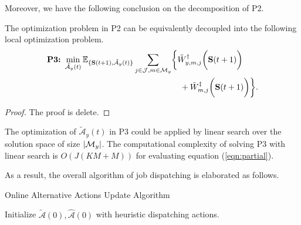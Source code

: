 Moreover, we have the following conclusion on the decomposition of P2.
\begin{lemma}[]
    The optimization problem in P2 can be equivalently decoupled into the following local optimization problem.
    {\small
    \begin{align}
        \textbf{P3:}~
        \min_{ \tilde{\mathcal{A}}_{y}(t) }
        \mathbb{E}_{\set{ \Stat(t+1), \tilde{\mathcal{A}}_{y}(t) }}
        &\sum_{j\in\jSpace,m\in\esSet_{y}} \Brace{
            \tilde{W}^{\AP}_{y,m,j}\Paren{\Stat(t+1)}
            \nonumber\\
            &~~~~~~~~~~~~~~~~~+\tilde{W}^{\ES}_{m,j}\Paren{\Stat(t+1)}
        }.
        \label{eqn:partial}
    \end{align}
    }
\end{lemma}
\begin{proof}
    The proof is delete.
\end{proof}

The optimization of $\tilde{\mathcal{A}}_{y}(t)$ in P3 could be applied by linear search over the solution space of size $|\mathcal{M}_{y}|$.
The computational complexity of solving P3 with linear search is $O(J(KM+M))$ for evaluating equation (\ref{eqn:partial}).

As a result, the overall algorithm of job dispatching is elaborated as follows.
\begin{algorithm}[!]
    \caption{Online Alternative Actions Update Algorithm}\label{alg_1}
    \DontPrintSemicolon %

    Initialize $\tilde{\mathcal{A}}(0),\hat{\mathcal{A}}(0)$ with heuristic dispatching actions.\;
\end{algorithm}

